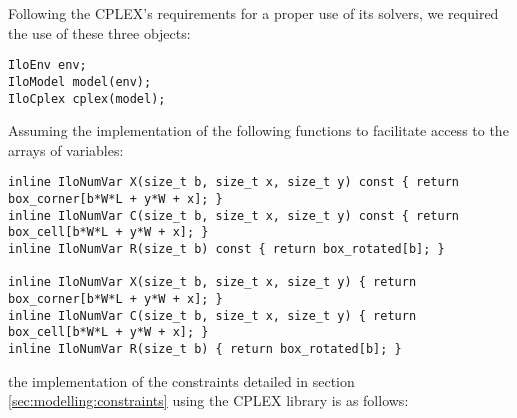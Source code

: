 Following the CPLEX's requirements for a proper use of its solvers, we required the
use of these three objects:

{\NOINDENT \begin{lstlisting}
IloEnv env;
IloModel model(env);
IloCplex cplex(model);
\end{lstlisting}}

Assuming the implementation of the following functions to facilitate
access to the arrays of variables:

{\NOINDENT \begin{lstlisting}
inline IloNumVar X(size_t b, size_t x, size_t y) const { return box_corner[b*W*L + y*W + x]; }
inline IloNumVar C(size_t b, size_t x, size_t y) const { return box_cell[b*W*L + y*W + x]; }
inline IloNumVar R(size_t b) const { return box_rotated[b]; }

inline IloNumVar X(size_t b, size_t x, size_t y) { return box_corner[b*W*L + y*W + x]; }
inline IloNumVar C(size_t b, size_t x, size_t y) { return box_cell[b*W*L + y*W + x]; }
inline IloNumVar R(size_t b) { return box_rotated[b]; }
\end{lstlisting}}

the implementation of the constraints detailed in section \ref{sec:modelling:constraints}
using the CPLEX library is as follows:


